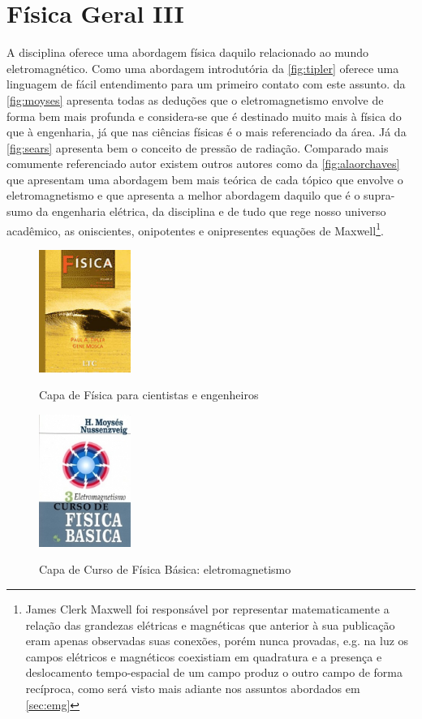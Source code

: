 \documentclass[
	12pt,				%
	openright,			%
	oneside,			%
	a4paper,			%
	english,			%
	french,				%
	spanish,			%
	brazil				%
	]{abntex2}
\begin{document}
\section{Física Geral III}\label{sec:fge3}
A disciplina oferece uma abordagem física daquilo relacionado ao mundo eletromagnético. Como uma abordagem introdutória  da \autoref{fig:tipler} oferece uma linguagem de fácil entendimento para um primeiro contato com este assunto.  da \autoref{fig:moyses} apresenta todas as deduções que o eletromagnetismo envolve de forma bem mais profunda e considera-se que é destinado muito mais à física do que à engenharia, já que nas ciências físicas  é o mais referenciado da área. Já  da \autoref{fig:sears} apresenta bem o conceito de pressão de radiação. Comparado mais comumente referenciado autor  existem outros autores como  da \autoref{fig:alaorchaves} que apresentam uma abordagem bem mais teórica de cada tópico que envolve o eletromagnetismo e que apresenta a melhor abordagem daquilo que é o supra-sumo da engenharia elétrica, da disciplina e de tudo que rege nosso universo acadêmico, as oniscientes, onipotentes e onipresentes equações de Maxwell\footnote{James Clerk Maxwell foi responsável por representar matematicamente a relação das grandezas elétricas e magnéticas que anterior à sua publicação eram apenas observadas suas conexões, porém nunca provadas, e.g. na luz os campos elétricos e magnéticos coexistiam em quadratura e a presença e deslocamento tempo-espacial de um campo produz o outro campo de forma recíproca, como será visto mais adiante nos assuntos abordados em \autoref{sec:emg}}.
\begin{figure}[!htb]
	\caption{Capa de Física para cientistas e engenheiros}
	\centering
	\includegraphics[width=3cm]{tipler.jpg}
	\label{fig:tipler}
\end{figure}
\begin{figure}[!htb]
	\caption{Capa de Curso de Física Básica: eletromagnetismo}
	\centering
	\includegraphics[width=3cm]{moyses.jpg}
	\label{fig:moyses}
\end{figure}
\end{document}
